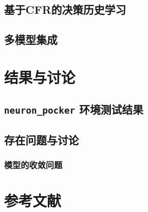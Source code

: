 \documentclass[11pt]{article}
\begin{document}
\subsection{基于CFR的决策历史学习}
\label{sec:org32c6ee0}
\subsection{多模型集成}
\label{sec:orga37efbc}
\section{结果与讨论}
\label{sec:org67e00d4}
\subsection{\texttt{neuron\_pocker} 环境测试结果}
\label{sec:org5620382}
\subsection{存在问题与讨论}
\label{sec:org5b913f4}
\subsubsection{模型的收敛问题}
\label{sec:orgaad24c7}
\subsubsection{}
\label{sec:org109b4fe}
\section{参考文献}
\label{sec:orgf73946a}
\end{document}
